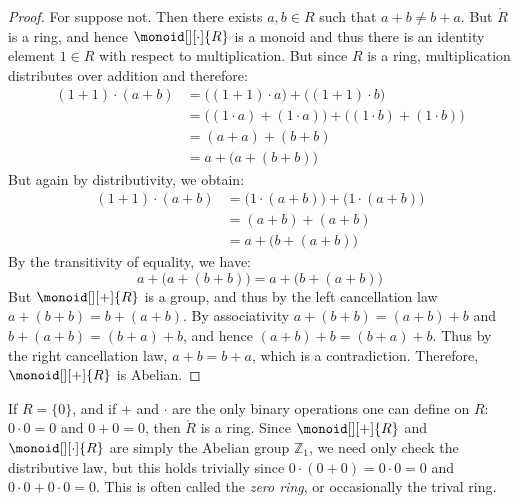 \documentclass{article}                                                        %
\begin{document}
        \begin{proof}
            For suppose not. Then there exists $a,b\in{R}$ such that
            $a+b\ne{b}+a$. But $\ring{R}$ is a ring, and hence
            $\monoid[][\cdot]{R}$ is a monoid and thus there is an identity
            element $1\in{R}$ with respect to multiplication. But since $R$ is a
            ring, multiplication distributes over addition and therefore:
            \begin{align}
                (1+1)\cdot(a+b)
                    &=\big((1+1)\cdot{a}\big)+\big((1+1)\cdot{b}\big)
                    \tag{Left Distributive Law}\\
                    &=\big((1\cdot{a})+(1\cdot{a})\big)+
                        \big((1\cdot{b})+(1\cdot{b})\big)
                    \tag{Right Distributive Law}\\
                    &=(a+a)+(b+b)
                        \tag{Multiplicative Identity}\\
                    &=a+\big(a+(b+b)\big)
                        \tag{Associative Law}
            \end{align}
            But again by distributivity, we obtain:
            \begin{align}
                (1+1)\cdot(a+b)
                &=\big(1\cdot(a+b)\big)+\big(1\cdot(a+b)\big)
                \tag{Right Distributive Law}\\
                &=(a+b)+(a+b)
                    \tag{Multiplicative Identity}\\
                &=a+\big(b+(a+b)\big)
                    \tag{Associative Law}
            \end{align}
            By the transitivity of equality, we have:
            \begin{equation}
                a+\big(a+(b+b)\big)=a+\big(b+(a+b)\big)
            \end{equation}
            But $\monoid[][+]{R}$ is a group, and thus by the left cancellation
            law $a+(b+b)=b+(a+b)$. By associativity $a+(b+b)=(a+b)+b$ and
            $b+(a+b)=(b+a)+b$, and hence $(a+b)+b=(b+a)+b$. Thus by the right
            cancellation law, $a+b=b+a$, which is a contradiction. Therefore,
            $\monoid[][+]{R}$ is Abelian.
        \end{proof}
        \begin{example}
            If $R=\{0\}$, and if $+$ and $\cdot$ are the only binary operations
            one can define on $R$: $0\cdot{0}=0$ and $0+0=0$, then
            $\ring{R}$ is a ring. Since $\monoid[][+]{R}$ and
            $\monoid[][\cdot]{R}$ are simply the Abelian group $\mathbb{Z}_{1}$,
            we need only check the distributive law, but this holds trivially
            since $0\cdot(0+0)=0\cdot{0}=0$ and $0\cdot{0}+0\cdot{0}=0$. This is
            often called the \textit{zero ring}, or occasionally the trival
            ring.
        \end{example}
\end{document}
